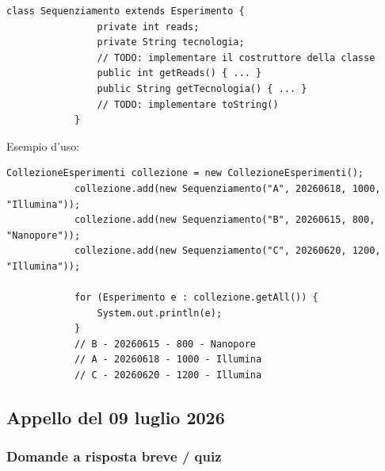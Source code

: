 \begin{enumerate}
\begin{lstlisting}[style=java]
			class Sequenziamento extends Esperimento {
				private int reads;
				private String tecnologia;
				// TODO: implementare il costruttore della classe
				public int getReads() { ... }
				public String getTecnologia() { ... }
				// TODO: implementare toString()
			}
		\end{lstlisting}
		
		Esempio d'uso:
		\begin{lstlisting}[style=java]
			CollezioneEsperimenti collezione = new CollezioneEsperimenti();
			collezione.add(new Sequenziamento("A", 20260618, 1000, "Illumina"));
			collezione.add(new Sequenziamento("B", 20260615, 800, "Nanopore"));
			collezione.add(new Sequenziamento("C", 20260620, 1200, "Illumina"));
			
			for (Esperimento e : collezione.getAll()) {
				System.out.println(e);
			}
			// B - 20260615 - 800 - Nanopore
			// A - 20260618 - 1000 - Illumina
			// C - 20260620 - 1200 - Illumina
		\end{lstlisting}
	\end{enumerate}
	
	\subsection{Appello del 09 luglio 2026}
	
	\subsubsection{Domande a risposta breve / quiz}
	
